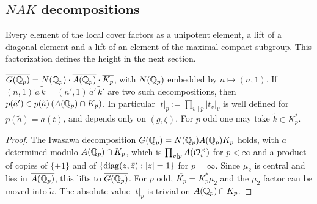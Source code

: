 \subsection{\texorpdfstring{$NAK$}{NAK} decompositions}

Every element of the local cover factors as a unipotent element, a lift
of a diagonal element and a lift of an element of the maximal compact
subgroup. This factorization defines the height in the next section.


\begin{lemma}\label{lem:NAK-local}
$\overline{G(\mathbb{Q}_p)}=N(\mathbb{Q}_p)\cdot\overline{A(\mathbb{Q}_p)}\cdot\overline{K_p}$,
with $N(\mathbb{Q}_p)$ embedded by $n\mapsto(n,1)$. If
$(n,1)\,\tilde a\,\tilde k=(n',1)\,\tilde a'\,\tilde k'$ are two such
decompositions, then $p(\tilde a')\in p(\tilde a)\,(A(\mathbb{Q}_p)\cap K_p)$.
In particular $|t|_p:=\prod_{v\mid p}|t_v|_v$ is well defined for
$p(\tilde a)=a(t)$, and depends only on $(g,\zeta)$. For $p$ odd one may
take $\tilde k\in K_p^*$.
\end{lemma}

\begin{proof}
The Iwasawa decomposition $G(\mathbb{Q}_p)=N(\mathbb{Q}_p)A(\mathbb{Q}_p)K_p$ holds, with
$a$ determined modulo $A(\mathbb{Q}_p)\cap K_p$, which is
$\prod_{v\mid p}A(\mathcal{O}_v^\times)$ for $p<\infty$ and a product of copies
of $\{\pm1\}$ and of $\{\operatorname{diag}(z,\bar z):|z|=1\}$ for $p=\infty$. Since
$\mu_2$ is central and lies in $\overline{A(\mathbb{Q}_p)}$, this lifts to
$\overline{G(\mathbb{Q}_p)}$. For $p$ odd, $\overline{K_p}=K_p^*\mu_2$ and the
$\mu_2$ factor can be moved into $\tilde a$. The absolute value $|t|_p$
is trivial on $A(\mathbb{Q}_p)\cap K_p$.
\end{proof}


